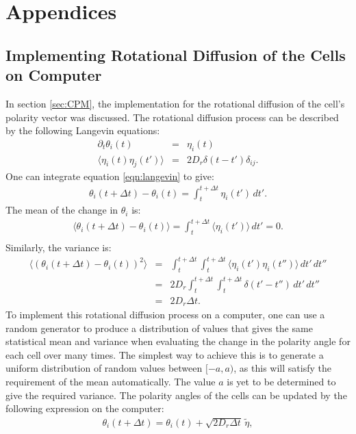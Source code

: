 \documentclass[a4paper,12pt]{article}
\newcommand{\inc}{\Delta}
\begin{document}
\appendix
\section{Appendices}
\subsection{Implementing Rotational Diffusion of the Cells on Computer}
\label{app:rotatediff}
In section \ref{sec:CPM}, the implementation for the rotational diffusion of the cell's polarity vector was discussed. The rotational diffusion process can be described by the following Langevin equations:
\begin{eqnarray}
\partial_t\theta_i(t) & = & \eta_i(t)\label{eqn:langevin}\\
\langle{\eta_i(t)\eta_j(t')\rangle} & = & 2D_r\delta(t-t')\delta_{ij}.
\end{eqnarray}
One can integrate equation \ref{eqn:langevin} to give:
\begin{eqnarray}
\theta_i(t+\inc t) - \theta_i(t) = \int_{t}^{t+\inc t} \eta_i (t')\,dt'.
\end{eqnarray}
The mean of the change in $\theta_i$ is:
\begin{eqnarray}
\langle\theta_i(t+\inc t) - \theta_i(t)\rangle = \int_{t}^{t+\inc t} \langle\eta_i (t')\rangle\,dt' = 0.\\
\end{eqnarray}
Similarly, the variance is:
\begin{eqnarray}
\langle\left(\theta_i(t+\inc t) - \theta_i(t)\right)^2\rangle & = & \int_{t}^{t+\inc t}\int_{t}^{t+\inc t} \langle\eta_i (t')\eta_i(t'')\rangle\,dt'\,dt''\\
& = & 2D_r \int_{t}^{t+\inc t}\int_{t}^{t+\inc t} \delta(t'-t'')\,dt'\,dt''\\
& = & 2D_r\inc t\label{eqn:anglevar}.
\end{eqnarray}
To implement this rotational diffusion process on a computer, one can use a random generator to produce a distribution of values that gives the same statistical mean and variance when evaluating the change in the polarity angle for each cell over many times. The simplest way to achieve this is to generate a uniform distribution of random values between $[-a,a)$, as this will satisfy the requirement of the mean automatically. The value $a$ is yet to be determined to give the required variance. The polarity angles of the cells can be updated by the following expression on the computer:
\begin{eqnarray}
\theta_i (t + \inc t) = \theta_i (t) + \sqrt{2 D_r \inc t}\, \tilde\eta,
\end{eqnarray}
\end{document}
